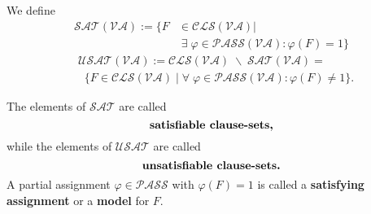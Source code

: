 \documentclass{article}
\def\mva{{\mathcal{VA}}}
\def\mpass{{\mathcal{PASS}}}
\def\mcls{{\mathcal{CLS}}}
\def\msat{{\mathcal{SAT}}}
\def\musat{{\mathcal{USAT}}}
\begin{document}
We define
\begin{align*}
\pmb{\msat(\mva)} := \{ F & \in \mcls(\mva)| \\
& \; \exists \; \varphi \in \mpass(\mva) : \varphi(F) = 1 \}
\end{align*}
\begin{align*}
& \pmb{\musat(\mva)} := \mcls(\mva) \;\backslash\; \msat(\mva) = \\
& \;\; \{F\in \mcls(\mva) \mid \forall\; \varphi \in \mpass(\mva) : \varphi(F) \neq 1\}.
\end{align*}

The elements of $\msat$ are called
\[
\mbox{\textbf{satisfiable clause-sets,}}
\]
while the elements of $\musat$ are called
\[
\mbox{\textbf{unsatisfiable clause-sets.}}
\]
A partial assignment $\varphi \in \mpass$ with $\varphi(F) = 1$ is called a \textbf{satisfying assignment} or a \textbf{model} for $F$.
\end{document}
